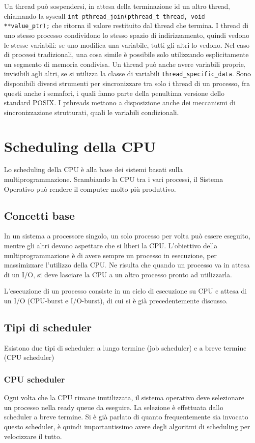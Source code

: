 \documentclass[a4paper]{article}
\begin{document}
Un thread può sospendersi, in attesa della terminazione id un altro thread, chiamando la syscall \texttt{int pthread\_join(pthread\_t thread, void **value\_ptr);} che ritorna il valore restituito dal thread che termina.
I thread di uno stesso processo condividono lo stesso spazio di indirizzamento, quindi vedono le stesse variabili: se uno modifica una variabile, tutti gli altri lo vedono. Nel caso di processi tradizionali, una cosa simile è possibile solo utilizzando esplicitamente un segmento di memoria condivisa. Un thread può anche avere variabili proprie, invisibili agli altri, se si utilizza la classe di variabili \texttt{thread\_specific\_data}. \newline
Sono disponibili diversi strumenti per sincronizzare tra solo i thread di un processo, fra questi anche i semafori, i quali fanno parte della penultima versione dello standard POSIX. I pthreads mettono a disposizione anche dei meccanismi di sincronizzazione strutturati, quali le variabili condizionali.


\section{Scheduling della CPU}
Lo scheduling della CPU è alla base dei sistemi basati sulla multiprogrammazione. Scambiando la CPU tra i vari processi, il Sistema Operativo può rendere il computer molto più produttivo.
\subsection{Concetti base}
In un sistema a processore singolo, un solo processo per volta può essere eseguito, mentre gli altri devono aspettare che si liberi la CPU. L'obiettivo della multiprogrammazione è di avere sempre un processo in esecuzione, per massimizzare l'utilizzo della CPU. Ne risulta che quando un processo va in attesa di un I/O, si deve lasciare la CPU a un altro processo pronto ad utilizzarla.

L'esecuzione di un processo consiste in un ciclo di esecuzione su CPU e attesa di un I/O (CPU-burst e I/O-burst), di cui si è già precedentemente discusso.

\subsection{Tipi di scheduler}
Esistono due tipi di scheduler: a lungo termine (job scheduler) e a breve termine (CPU scheduler)

\subsubsection{CPU scheduler}
Ogni volta che la CPU rimane inutilizzata, il sistema operativo deve selezionare un processo nella ready queue da eseguire. La selezione è effettuata dallo scheduler a breve termine. Si è già parlato di quanto frequentemente sia invocato questo scheduler, è quindi importantissimo avere degli algoritmi di scheduling per velocizzare il tutto.
\end{document}
